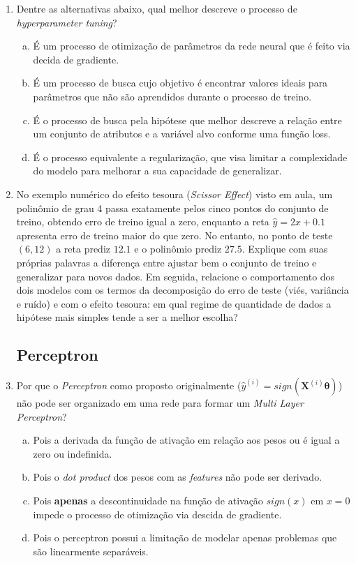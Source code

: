 \documentclass{dlproblemset}
\begin{document}
\begin{enumerate}[1)]
    \item Dentre as alternativas abaixo, qual melhor descreve o processo de \textit{hyperparameter tuning}?
    \begin{enumerate}[(a)]
	    \item É um processo de otimização de parâmetros da rede neural que é feito via decida de gradiente.
	    \item É um processo de busca cujo objetivo é encontrar valores ideais para parâmetros que não são aprendidos durante o processo de treino.
	    \item É o processo de busca pela hipótese que melhor descreve a relação entre um conjunto de atributos e a variável alvo conforme uma função loss.
	    \item É o processo equivalente a regularização, que visa limitar a complexidade do modelo para melhorar a sua capacidade de generalizar.
    \end{enumerate}

    \item No exemplo numérico do efeito tesoura (\textit{Scissor Effect}) visto em aula, um polinômio de grau 4 passa exatamente pelos cinco pontos do conjunto de treino, obtendo erro de treino igual a zero, enquanto a reta $\hat{y} = 2x + 0.1$ apresenta erro de treino maior do que zero. No entanto, no ponto de teste $(6, 12)$ a reta prediz $12.1$ e o polinômio prediz $27.5$. Explique com suas próprias palavras a diferença entre ajustar bem o conjunto de treino e generalizar para novos dados. Em seguida, relacione o comportamento dos dois modelos com os termos da decomposição do erro de teste (viés, variância e ruído) e com o efeito tesoura: em qual regime de quantidade de dados a hipótese mais simples tende a ser a melhor escolha?

\subsection*{Perceptron}

    \item Por que o \textit{Perceptron} como proposto originalmente ($\hat{y}^{(i)} = sign(\mathbf{X}^{(i)}\boldsymbol{\theta})$) não pode ser organizado em uma rede para formar um \textit{Multi Layer Perceptron}?
    \begin{enumerate}[(a)]
        \item Pois a derivada da função de ativação em relação aos pesos ou é igual a zero ou indefinida.
        \item Pois o \textit{dot product} dos pesos com as \textit{features} não pode ser derivado.
        \item Pois \textbf{apenas} a descontinuidade na função de ativação $sign(x)$ em $x = 0$ impede o processo de otimização via descida de gradiente.
        \item Pois o perceptron possui a limitação de modelar apenas problemas que são linearmente separáveis.
    \end{enumerate}


\end{enumerate}
\end{document}
